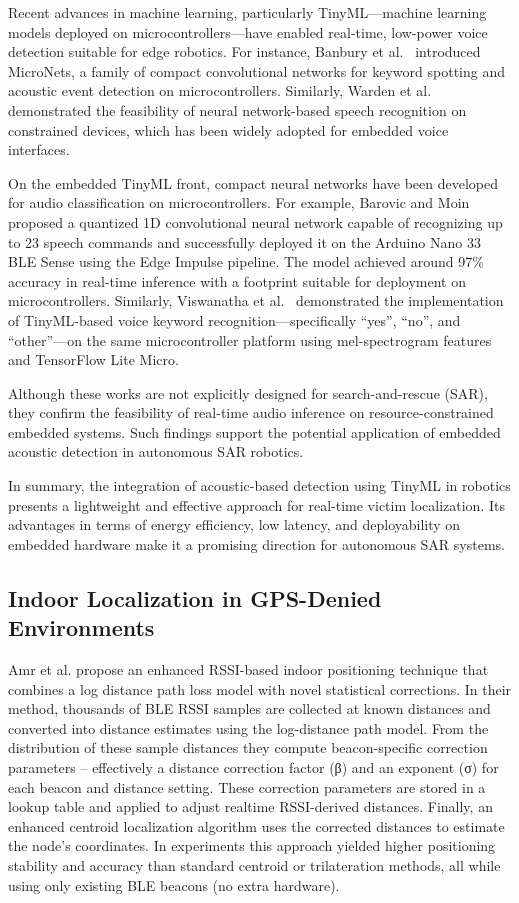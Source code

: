 Recent advances in machine learning, particularly TinyML—machine learning models deployed on microcontrollers—have enabled real-time, low-power voice detection suitable for edge robotics. For instance, Banbury et al.~\cite{Banbury2021micronets} introduced MicroNets, a family of compact convolutional networks for keyword spotting and acoustic event detection on microcontrollers. Similarly, Warden et al.~\cite{Warden2018speech} demonstrated the feasibility of neural network-based speech recognition on constrained devices, which has been widely adopted for embedded voice interfaces.

On the embedded TinyML front, compact neural networks have been developed for audio classification on microcontrollers. For example, Barovic and Moin~\cite{Barovic2025tinyml} proposed a quantized 1D convolutional neural network capable of recognizing up to 23 speech commands and successfully deployed it on the Arduino Nano 33 BLE Sense using the Edge Impulse pipeline. The model achieved around 97\% accuracy in real-time inference with a footprint suitable for deployment on microcontrollers. Similarly, Viswanatha et al.~\cite{Viswanatha2022tinyml} demonstrated the implementation of TinyML-based voice keyword recognition—specifically “yes”, “no”, and “other”—on the same microcontroller platform using mel-spectrogram features and TensorFlow Lite Micro.

Although these works are not explicitly designed for search-and-rescue (SAR), they confirm the feasibility of real-time audio inference on resource-constrained embedded systems. Such findings support the potential application of embedded acoustic detection in autonomous SAR robotics.

In summary, the integration of acoustic-based detection using TinyML in robotics presents a lightweight and effective approach for real-time victim localization. Its advantages in terms of energy efficiency, low latency, and deployability on embedded hardware make it a promising direction for autonomous SAR systems.

\subsection{Indoor Localization in GPS-Denied Environments}
Amr et al. \cite{nagah2021enhanced} propose an enhanced RSSI-based indoor positioning technique that combines a log
distance path loss model with novel statistical corrections. In their method, thousands of BLE RSSI samples are collected at known distances and converted into distance estimates using the log-distance path model. From the distribution of these sample distances they compute beacon-specific correction parameters – effectively a distance correction factor (β) and an exponent (σ) for each beacon and distance setting. These correction parameters are stored in a lookup table and applied to adjust realtime RSSI-derived distances. Finally, an enhanced centroid localization algorithm uses the corrected distances to estimate the node’s coordinates. In experiments this approach yielded higher positioning stability and accuracy than standard centroid or trilateration methods, all while using only existing BLE beacons (no extra hardware). 

